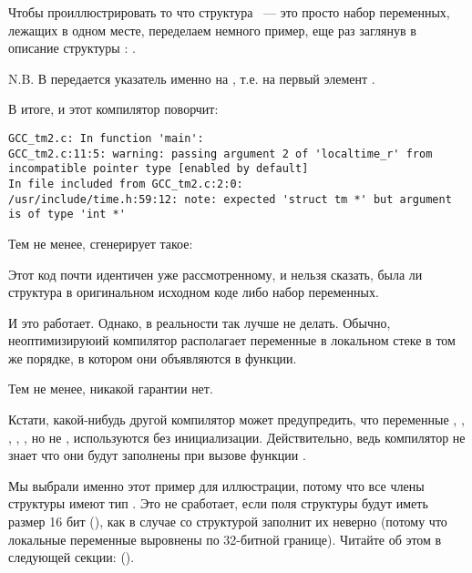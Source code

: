 ﻿

Чтобы проиллюстрировать то что структура ~--- это просто набор переменных, лежащих в одном месте, 
переделаем немного пример, еще раз заглянув в описание структуры : .



N.B. В  передается указатель именно на , 
т.е. на первый элемент .

В итоге, и этот компилятор поворчит:

\begin{lstlisting}[caption=GCC 4.7.3]
GCC_tm2.c: In function 'main':
GCC_tm2.c:11:5: warning: passing argument 2 of 'localtime_r' from incompatible pointer type [enabled by default]
In file included from GCC_tm2.c:2:0:
/usr/include/time.h:59:12: note: expected 'struct tm *' but argument is of type 'int *'
\end{lstlisting}

Тем не менее, сгенерирует такое:



Этот код почти идентичен уже рассмотренному, и нельзя сказать, была ли структура
в оригинальном исходном коде либо набор переменных.

И это работает. 
Однако, в реальности так лучше не делать. 
Обычно, неоптимизируюий компилятор располагает переменные в локальном
стеке в том же порядке, в котором они объявляются в функции.

Тем не менее, никакой гарантии нет.

Кстати, какой-нибудь другой компилятор может предупредить, что переменные , , ,
, , но не , используются без инициализации.
Действительно, ведь компилятор не знает что они будут заполнены при вызове функции
.

Мы выбрали именно этот пример для иллюстрации, потому что все члены структуры имеют тип \Tint.
Это не сработает, если поля структуры будут иметь размер 16 бит (), как в случае
со структурой \EMDASH{} 
заполнит их неверно 
(потому что локальные переменные выровнены по 32-битной границе).
Читайте об этом в следующей секции: 
\q{\StructurePackingSectionName} ().

